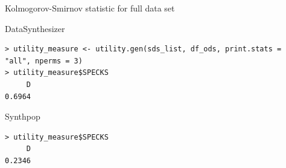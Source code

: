 \documentclass[xcolor=table]{beamer}
\begin{document}


\begin{frame}[fragile]{Kolmogorov-Smirnov statistic for full data set}

DataSynthesizer
\begin{lstlisting}[firstnumber=1, label=glabels, xleftmargin=10pt,frame=single] 
> utility_measure <- utility.gen(sds_list, df_ods, print.stats = "all", nperms = 3)
> utility_measure$SPECKS
     D 
0.6964 
\end{lstlisting}
Synthpop
\begin{lstlisting}[firstnumber=1, label=glabels, xleftmargin=10pt,frame=single] 
> utility_measure$SPECKS
     D 
0.2346
\end{lstlisting}

\end{frame}
\end{document}
